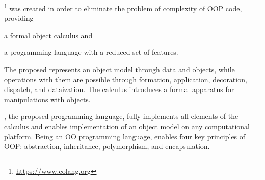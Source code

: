 \eolang{}\footnote{\url{https://www.eolang.org}}
was created in order to eliminate the problem of complexity of
OOP code, providing
\begin{inparaenum}[1)]
  \item a formal object calculus and
  \item a programming language with a reduced set of features.
\end{inparaenum}
The proposed \phic{} represents an object model through
data and objects, while operations with them are possible
through formation, application, decoration, dispatch, and dataization. The calculus
introduces a formal apparatus for manipulations with objects.

\eolang{}, the proposed programming language, fully implements
all elements of the calculus and enables implementation of
an object model on any computational platform.
Being an OO programming language, \eolang{} enables four key principles of OOP:
abstraction, inheritance, polymorphism, and encapsulation.
